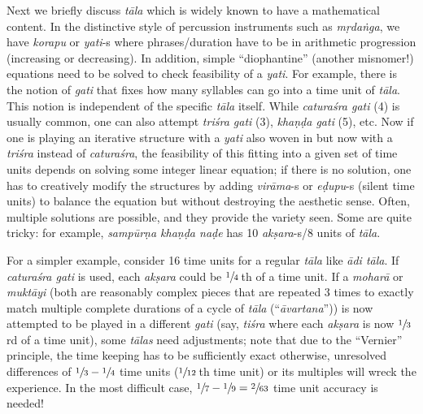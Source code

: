 Next we briefly discuss \textsl{tāla} which is widely known to have a mathematical content. In the distinctive style of percussion instruments such as \textsl{mṛdaṅga}, we have \textsl{korapu} or \textsl{yati}-s where phrases/duration have to be in arithmetic progression (increasing or decreasing). In addition, simple “diophantine” (another misnomer!) equations need to be solved to check feasibility of a \textsl{yati}. For example, there is the notion of \textsl{gati}
 that fixes how many syllables can go into a time unit of \textsl{tāla}. This notion is independent of the specific \textsl{tāla} itself. While \textsl{caturaśra gati} (4) is usually common, one can also attempt \textsl{triśra gati} (3), \textsl{khaṇḍa gati} (5), etc. Now if one is playing an iterative structure with a \textsl{yati} also woven in but now with a \textsl{triśra} instead of \textsl{caturaśra}, the feasibility of this fitting into a given set of time units depends on solving some integer linear equation; if there is no solution, one has to creatively modify the structures by adding \textsl{virāma}-s or \hbox{\textsl{eḍupu}-s} (silent time units) to balance the equation but without destroying the aesthetic sense. Often, multiple solutions are possible, and they provide the variety seen. Some are quite tricky: for example, \textsl{sampūrṇa khaṇḍa naḍe} has 10 \textsl{akṣara}-s/8 units of \textsl{tāla}.

For a simpler example, consider 16 time units for a regular \textsl{tāla} like \textsl{ādi tāla}. If \textsl{caturaśra gati} is used, each \textsl{akṣara} could be $\sfrac{1}{4}$\,th of a time unit. If a \textsl{moharā} or \textsl{muktāyi} (both are reasonably complex pieces that are repeated 3 times to exactly match multiple complete durations of a cycle of \textsl{tāla} (“\textsl{āvartana}”)) is now attempted to be played in a different \textsl{gati} (say, \textsl{tiśra} where each \textsl{akṣara} is now $\sfrac{1}{3}$\,rd of a time unit), some \textsl{tālas} need adjustments; note that due to the “Vernier” principle, the time keeping has to be sufficiently exact otherwise, unresolved differences of $\sfrac{1}{3}-\sfrac{1}{4}$ time units ($\sfrac{1}{12}$\,th time unit) or its multiples will wreck the experience. In the most difficult case, $\sfrac{1}{7}- \sfrac{1}{9} = \sfrac{2}{63}$ time unit accuracy is needed!

